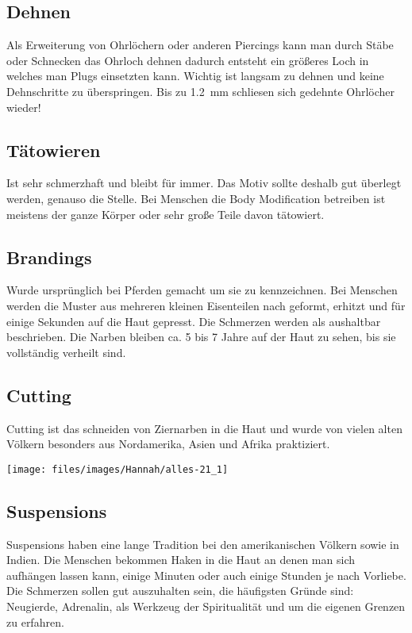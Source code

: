 \subsection{Dehnen}
Als Erweiterung von Ohrlöchern oder anderen Piercings kann man durch Stäbe oder Schnecken das Ohrloch
dehnen dadurch entsteht ein größeres Loch in welches man Plugs einsetzten kann. Wichtig ist langsam
zu dehnen und keine Dehnschritte zu überspringen. Bis zu \SI{1,2}{\milli\metre} schliesen sich
gedehnte Ohrlöcher wieder!

\subsection{Tätowieren}
Ist sehr schmerzhaft und bleibt für immer. Das Motiv sollte deshalb gut überlegt werden, genauso die
Stelle. Bei Menschen die Body Modification betreiben ist meistens der ganze Körper oder sehr große
Teile davon tätowiert.

\subsection{Brandings}
Wurde ursprünglich bei Pferden gemacht um sie zu kennzeichnen. Bei Menschen werden die Muster aus
mehreren kleinen Eisenteilen nach geformt, erhitzt und für einige Sekunden auf die Haut gepresst. Die
Schmerzen werden als aushaltbar beschrieben. Die Narben bleiben ca. 5 bis 7 Jahre auf der Haut zu
sehen, bis sie vollständig verheilt sind.

\subsection{Cutting}
Cutting ist das schneiden von Ziernarben in die Haut und wurde von vielen alten Völkern besonders aus
Nordamerika, Asien und Afrika praktiziert.

\begin{figurewrapper}
	\texttt{[image: files/images/Hannah/alles-21\_1]}%
\end{figurewrapper}

\subsection{Suspensions}
Suspensions haben eine lange Tradition bei den amerikanischen Völkern sowie in Indien. Die Menschen
bekommen Haken in die Haut an denen man sich aufhängen lassen kann, einige Minuten oder auch einige
Stunden je nach Vorliebe. Die Schmerzen sollen gut auszuhalten sein, die häufigsten Gründe sind:
Neugierde, Adrenalin, als Werkzeug der Spiritualität und um die eigenen Grenzen zu erfahren.

